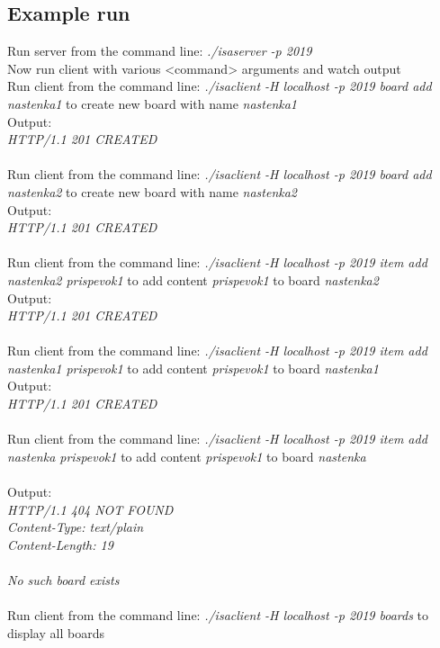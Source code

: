 \documentclass[11pt, a4paper]{article}
\begin{document}
	\subsection{Example run}
	Run server from the command line: \textit{./isaserver -p 2019} \\
	Now run client with various <command> arguments and watch output \\
	Run client from the command line: \textit{./isaclient -H localhost -p 2019 board add nastenka1} to create new board with name \textit{nastenka1} \\
	Output: \\
	\textit{HTTP/1.1 201 CREATED \\}
	\\Run client from the command line: \textit{./isaclient -H localhost -p 2019 board add nastenka2} to create new board with name \textit{nastenka2} \\
	Output: \\
	\textit{HTTP/1.1 201 CREATED \\}
	\\Run client from the command line: \textit{./isaclient -H localhost -p 2019 item add nastenka2 prispevok1} to add content \textit{prispevok1} to board 		\textit{nastenka2} \\
	Output: \\
	\textit{HTTP/1.1 201 CREATED \\}
	\\Run client from the command line: \textit{./isaclient -H localhost -p 2019 item add nastenka1 prispevok1} to add content \textit{prispevok1} to board 		\textit{nastenka1} \\
	Output: \\
	\textit{HTTP/1.1 201 CREATED \\}
	\\Run client from the command line: \textit{./isaclient -H localhost -p 2019 item add nastenka prispevok1} to add content \textit{prispevok1} to board 		\textit{nastenka} \\\\
	Output: \\
	\textit{HTTP/1.1 404 NOT FOUND \\ Content-Type: text/plain \\ Content-Length: 19 \\ \\ No such board exists \\}
	\\Run client from the command line: \textit{./isaclient -H localhost -p 2019 boards} to display all boards \\
\end{document}
